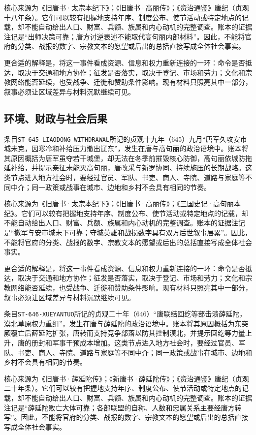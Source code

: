 核心来源为《旧唐书·太宗本纪下》；《旧唐书·高丽传》；《资治通鉴》唐纪（贞观十八年条）。它们可以较有把握地支持年序、制度公布、使节活动或特定地点的记载，却不能自动给出人口、财富、兵额、族属和内心动机的完整调查。账本的证据注记是“出师决策可靠；唐方讨逆表述不能取代高句丽内部材料”。因此，不能将官府的分类、战报的数字、宗教文本的愿望或后出的总括直接写成全体社会事实。

更合适的解释是，将这一事件看成资源、信息和权力重新连接的一环：命令是否抵达，取决于交通和地方协作；征发是否落实，取决于登记、市场和劳力；文化和宗教网络能否延续，也受战争、迁徙和赞助条件影响。现有材料只照亮其中一部分，叙事必须让区域差异与材料沉默继续可见。

\subsection{环境、财政与社会后果}

条目\texttt{ST-645-LIAODONG-WITHDRAWAL}所记的贞观十九年（645）九月“唐军久攻安市城未克，因寒冷和补给压力撤出辽东”，发生在唐与高句丽的政治语境中。账本将其原因概括为唐军虽夺若干城堡，却无法在冬季前摧毁核心防御，高句丽依城防拖延补给，并提示亲征未能灭高句丽，唐改采与新罗协同、持续施压的长期战略。这类节点进入地方社会时，要经过官员、军队、书吏、商人、寺院、道路与家庭等不同中介；同一政策或战事在城市、边地和乡村不会具有相同的节奏。

核心来源为《旧唐书·太宗本纪下》；《旧唐书·高丽传》；《三国史记·高句丽本纪》。它们可以较有把握地支持年序、制度公布、使节活动或特定地点的记载，却不能自动给出人口、财富、兵额、族属和内心动机的完整调查。账本的证据注记是“撤军与安市城未下可靠；守城英雄和战损数字具有双方后世叙事层累”。因此，不能将官府的分类、战报的数字、宗教文本的愿望或后出的总括直接写成全体社会事实。

更合适的解释是，将这一事件看成资源、信息和权力重新连接的一环：命令是否抵达，取决于交通和地方协作；征发是否落实，取决于登记、市场和劳力；文化和宗教网络能否延续，也受战争、迁徙和赞助条件影响。现有材料只照亮其中一部分，叙事必须让区域差异与材料沉默继续可见。

条目\texttt{ST-646-XUEYANTUO}所记的贞观二十年（646）“唐联结回纥等部击溃薛延陀，漠北草原权力重组”，发生在唐与薛延陀的政治语境中。账本将其原因概括为东突厥覆亡后薛延陀扩张，唐转而支持竞争部落以防其控制漠北，并提示回纥等力量上升，唐的册封和军事干预成本增加。这类节点进入地方社会时，要经过官员、军队、书吏、商人、寺院、道路与家庭等不同中介；同一政策或战事在城市、边地和乡村不会具有相同的节奏。

核心来源为《旧唐书·薛延陀传》；《新唐书·薛延陀传》；《资治通鉴》唐纪（贞观二十年条）。它们可以较有把握地支持年序、制度公布、使节活动或特定地点的记载，却不能自动给出人口、财富、兵额、族属和内心动机的完整调查。账本的证据注记是“薛延陀败亡大体可靠；各部联盟的自称、人数和忠属关系主要经唐方转写”。因此，不能将官府的分类、战报的数字、宗教文本的愿望或后出的总括直接写成全体社会事实。

